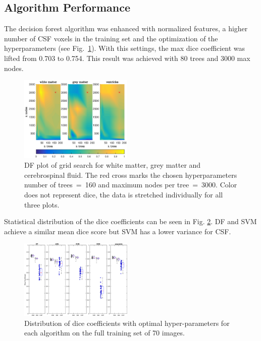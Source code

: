 \documentclass[journal]{IEEEtran}
\begin{document}
\subsection{Algorithm Performance}



The decision forest algorithm was enhanced with normalized features, a higher number of CSF voxels in the training set and the optimization of the hyperparameters (see Fig.~\ref{f.df_white}). With this settings, the max dice coefficient was lifted from 0.703 to 0.754. This result was achieved with 80 trees and 3000 max nodes.

\begin{figure}[h!]\label{f.df_white}
	\centering
	\includegraphics[width=0.48\textwidth]{images/df_grid}
	\caption{DF plot of grid search for white matter, grey matter and cerebrospinal fluid. The red cross marks the chosen hyperparameters number of trees~=~160 and maximum nodes per tree~=~3000. Color does not represent dice, the data is stretched individually for all three plots.}
\end{figure}



Statistical distribution of the dice coefficients can be seen in Fig. \ref{f.boxplot}. DF and SVM achieve a similar mean dice score but SVM has a lower variance for CSF.
\begin{figure}\label{f.boxplot}
	\centering
	\includegraphics[width=0.48\textwidth]{images/boxplot}
	\caption{Distribution of dice coefficients with optimal hyper-parameters for each algorithm on the full training set of 70 images.}
\end{figure}
\end{document}
